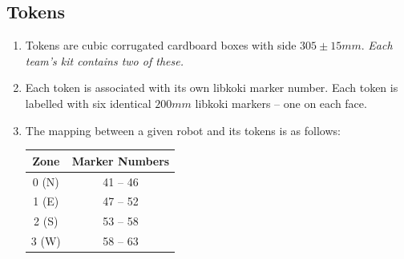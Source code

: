 \subsection{Tokens}
\label{sub:Tokens}
\begin{enumerate}
\item Tokens are cubic corrugated cardboard boxes with side $305 \pm 15 mm$.
      \emph{Each team's kit contains two of these.}

\item Each token is associated with its own libkoki marker number.
      Each token is labelled with six identical $200mm$ libkoki markers -- one on each face.

\item The mapping between a given robot and its tokens is as follows:

\begin{center}
  \begin{tabular}{cc}
    \toprule
    \textbf{Zone} & \textbf{Marker Numbers} \\
    \midrule
    0 (N) & 41 -- 46 \\
    1 (E) & 47 -- 52 \\
    2 (S) & 53 -- 58 \\
    3 (W) & 58 -- 63 \\
    \bottomrule
  \end{tabular}
\end{center}

\end{enumerate}

\clearpage
